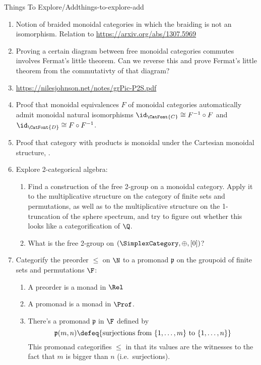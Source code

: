 \begin{remark}{Things To Explore/Add}{things-to-explore-add}
\begin{enumerate}
        \item Notion of braided monoidal categories in which the braiding is not an isomorphism. Relation to \url{https://arxiv.org/abs/1307.5969}
        \item Proving a certain diagram between free monoidal categories commutes involves Fermat's little theorem. Can we reverse this and prove Fermat's little theorem from the commutativty of that diagram?
        \item \url{https://nilesjohnson.net/notes/grPic-P2S.pdf}
        \item Proof that monoidal equivalences $F$ of monoidal categories automatically admit monoidal natural isomorphisms $\id_{\CatFont{C}}\cong F^{-1}\circ F$ and $\id_{\CatFont{D}}\cong F\circ F^{-1}$.
        \item Proof that category with products is monoidal under the Cartesian monoidal structure, \cite{MO382264}.
        \item Explore 2-categorical algebra:
            \begin{enumerate}
                \item Find a construction of the free 2-group on a monoidal category. Apply it to the multiplicative structure on the category of finite sets and permutations, as well as to the multiplicative structure on the 1-truncation of the sphere spectrum, and try to figure out whether this looks like a categorification of $\Q$.
                \item What is the free 2-group on $(\SimplexCategory,\oplus,[0])$?
            \end{enumerate}
        \item Categorify the preorder $\leq$ on $\N$ to a promonad $\mathfrak{p}$ on the groupoid of finite sets and permutations $\F$:
            \begin{enumerate}
                \item A preorder is a monad in $\Rel$
                \item A promonad is a monad in $\Prof$.
                \item There's a promonad $\mathfrak{p}$ in $\F$ defined by
                    \[
                        \mathfrak{p}(m,n)%
                        \defeq%
                        \{%
                            \text{surjections from $\{1,\ldots,m\}$ to $\{1,\ldots,n\}$}%
                        \}%
                    \]%
                    This promonad categorifies $\leq$ in that its values are the witnesses to the fact that $m$ is bigger than $n$ (i.e.\ surjections).

\end{enumerate}
\end{enumerate}
\end{remark}
